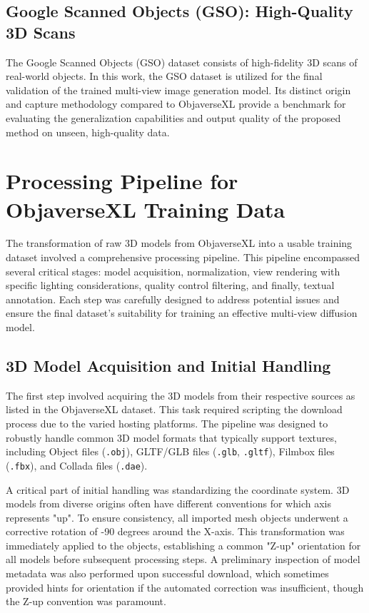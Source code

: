\subsection{Google Scanned Objects (GSO): High-Quality 3D Scans}\label{ssec:gso-overview}
The Google Scanned Objects (GSO) dataset \cite{gso} consists of high-fidelity 3D scans of real-world objects. In this work, the GSO dataset is utilized for the final validation of the trained multi-view image generation model. Its distinct origin and capture methodology compared to ObjaverseXL provide a benchmark for evaluating the generalization capabilities and output quality of the proposed method on unseen, high-quality data.

\section{Processing Pipeline for ObjaverseXL Training Data}\label{sec:objaversexl-pipeline}
The transformation of raw 3D models from ObjaverseXL into a usable training dataset involved a comprehensive processing pipeline. This pipeline encompassed several critical stages: model acquisition, normalization, view rendering with specific lighting considerations, quality control filtering, and finally, textual annotation. Each step was carefully designed to address potential issues and ensure the final dataset's suitability for training an effective multi-view diffusion model.

\subsection{3D Model Acquisition and Initial Handling}\label{ssec:model-acquisition}
The first step involved acquiring the 3D models from their respective sources as listed in the ObjaverseXL dataset. This task required scripting the download process due to the varied hosting platforms. The pipeline was designed to robustly handle common 3D model formats that typically support textures, including Object files (\texttt{.obj}), GLTF/GLB files (\texttt{.glb}, \texttt{.gltf}), Filmbox files (\texttt{.fbx}), and Collada files (\texttt{.dae}).

A critical part of initial handling was standardizing the coordinate system. 3D models from diverse origins often have different conventions for which axis represents "up". To ensure consistency, all imported mesh objects underwent a corrective rotation of -90 degrees around the X-axis. This transformation was immediately applied to the objects, establishing a common "Z-up" orientation for all models before subsequent processing steps. A preliminary inspection of model metadata was also performed upon successful download, which sometimes provided hints for orientation if the automated correction was insufficient, though the Z-up convention was paramount.

